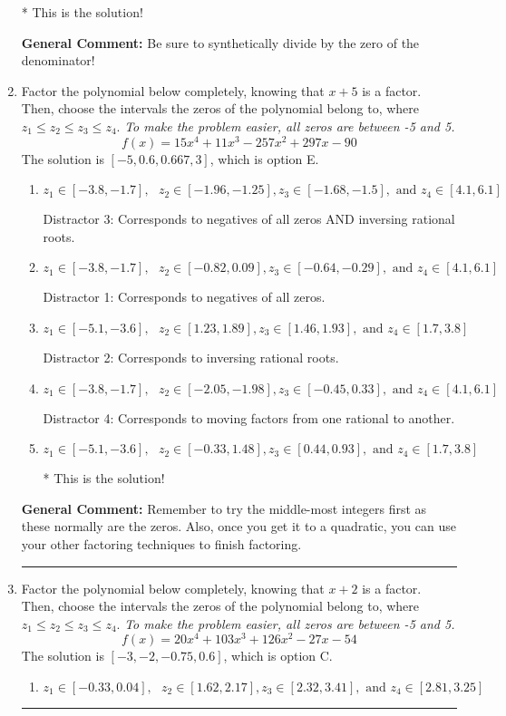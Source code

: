 \documentclass{extbook}[14pt]
\newcommand{\litem}[1]{\item #1

\rule{\textwidth}{0.4pt}}
\begin{document}
\begin{enumerate}
{\begin{enumerate}[label=\Alph*.]
* This is the solution!
\end{enumerate}

\textbf{General Comment:} Be sure to synthetically divide by the zero of the denominator!
}
\litem{
Factor the polynomial below completely, knowing that $x + 5$ is a factor. Then, choose the intervals the zeros of the polynomial belong to, where $z_1 \leq z_2 \leq z_3 \leq z_4$. \textit{To make the problem easier, all zeros are between -5 and 5.}
\[ f(x) = 15x^{4} +11 x^{3} -257 x^{2} +297 x -90 \]The solution is \( [-5, 0.6, 0.667, 3] \), which is option E.\begin{enumerate}[label=\Alph*.]
\item \( z_1 \in [-3.8, -1.7], \text{   }  z_2 \in [-1.96, -1.25], z_3 \in [-1.68, -1.5], \text{   and   } z_4 \in [4.1, 6.1] \)

 Distractor 3: Corresponds to negatives of all zeros AND inversing rational roots.
\item \( z_1 \in [-3.8, -1.7], \text{   }  z_2 \in [-0.82, 0.09], z_3 \in [-0.64, -0.29], \text{   and   } z_4 \in [4.1, 6.1] \)

 Distractor 1: Corresponds to negatives of all zeros.
\item \( z_1 \in [-5.1, -3.6], \text{   }  z_2 \in [1.23, 1.89], z_3 \in [1.46, 1.93], \text{   and   } z_4 \in [1.7, 3.8] \)

 Distractor 2: Corresponds to inversing rational roots.
\item \( z_1 \in [-3.8, -1.7], \text{   }  z_2 \in [-2.05, -1.98], z_3 \in [-0.45, 0.33], \text{   and   } z_4 \in [4.1, 6.1] \)

 Distractor 4: Corresponds to moving factors from one rational to another.
\item \( z_1 \in [-5.1, -3.6], \text{   }  z_2 \in [-0.33, 1.48], z_3 \in [0.44, 0.93], \text{   and   } z_4 \in [1.7, 3.8] \)

* This is the solution!
\end{enumerate}

\textbf{General Comment:} Remember to try the middle-most integers first as these normally are the zeros. Also, once you get it to a quadratic, you can use your other factoring techniques to finish factoring.
}
\litem{
Factor the polynomial below completely, knowing that $x + 2$ is a factor. Then, choose the intervals the zeros of the polynomial belong to, where $z_1 \leq z_2 \leq z_3 \leq z_4$. \textit{To make the problem easier, all zeros are between -5 and 5.}
\[ f(x) = 20x^{4} +103 x^{3} +126 x^{2} -27 x -54 \]The solution is \( [-3, -2, -0.75, 0.6] \), which is option C.\begin{enumerate}[label=\Alph*.]
\item \( z_1 \in [-0.33, 0.04], \text{   }  z_2 \in [1.62, 2.17], z_3 \in [2.32, 3.41], \text{   and   } z_4 \in [2.81, 3.25] \)


\end{enumerate}}
\end{enumerate}
\end{document}
